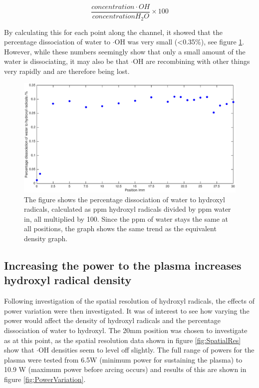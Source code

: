 \documentclass[11pt, oneside]{article}   	%
\begin{document}
\begin{equation} \label{eqn:PercentDiss}
	\frac{concentration \cdot OH}{concentration  H_2O} \times 100
\end{equation}

By calculating this for each point along the channel, it showed that the percentage dissociation of water to $\cdot$OH was very small (\textless 0.35\%), see figure \ref{fig:SpatialDissociation}.
However, while these numbers seemingly show that only a small amount of the water is dissociating, it may also be that $\cdot$OH are recombining with other things very rapidly and are therefore being lost.

\begin{figure}
	\centering
	\includegraphics[width=\textwidth]{Figures/SpatialDissociation2.eps}
	\caption{The figure shows the percentage dissociation of water to hydroxyl radicals, calculated as ppm hydroxyl radicals divided by ppm water in, all multiplied by 100. Since the ppm of water stays the same at all positions, the graph shows the same trend as the equivalent density graph.}
	\label{fig:SpatialDissociation}
\end{figure}


\subsection{Increasing the power to the plasma increases hydroxyl radical density}

Following investigation of the spatial resolution of hydroxyl radicals, the effects of power variation were then investigated.
It was of interest to see how varying the power would affect the density of hydroxyl radicals and the percentage dissociation of water to hydroxyl.
The 20mm position was chosen to investigate as at this point, as the spatial resolution data shown in figure \ref{fig:SpatialRes} show that $\cdot$OH densities seem to level off slightly. 
The full range of powers for the plasma were tested from 6.5W (minimum power for sustaining the plasma) to 10.9 W (maximum power before arcing occurs) and results of this are shown in figure \ref{fig:PowerVariation}.
\end{document}
